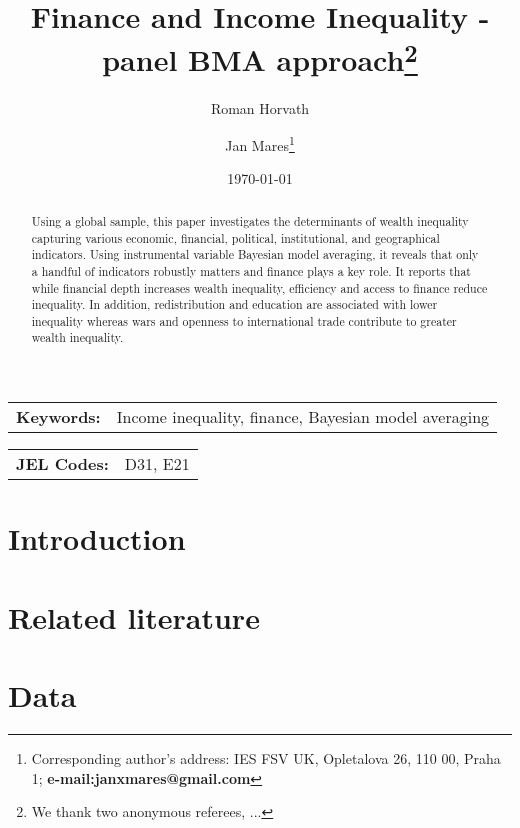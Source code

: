 \documentclass[a4paper,11pt]{article}
\title{Finance and Income Inequality - panel BMA approach\thanks{We thank two anonymous referees, ...}}
\author[a]{Roman Horvath}
\author[a]{Jan Mares\footnote{\footnotesize Corresponding author's address: IES FSV UK, Opletalova 26, 110 00, Praha 1; \textbf{e-mail:janxmares@gmail.com}}}
\affil[a]{Charles University, Prague}
\date{\today}
\begin{document}
\def\sym#1{\ifmmode^{#1}\else\(^{#1}\)\fi} %

\maketitle

\thispagestyle{empty}
\begin{abstract}
Using a global sample, this paper investigates the determinants of wealth inequality capturing various economic, financial, political, institutional, and geographical indicators. Using instrumental variable Bayesian model averaging, it reveals that only a handful of indicators robustly matters and finance plays a key role. It reports that while financial depth increases wealth inequality, efficiency and access to finance reduce inequality. In addition, redistribution and education are associated with lower inequality whereas wars and openness to international trade contribute to greater wealth inequality.
\end{abstract}

\bigskip

\begin{tabular}{p{0.25\hsize}p{0.6\hsize}} %
\textbf{Keywords:} & Income inequality, finance, Bayesian model averaging
\end{tabular}

\bigskip

\begin{tabular}{p{0.25\hsize}p{0.6\hsize}}
\textbf{JEL Codes:} & D31, E21\\
\end{tabular}

\clearpage
\setcounter{page}{1}

\section{Introduction}

\section{Related literature}
\citet{pikettyandzucman2014}
\section{Data}
\end{document}
